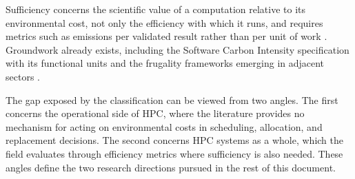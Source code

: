 Sufficiency concerns the scientific value of a computation relative to its environmental cost, not only the efficiency with which it runs, and requires metrics such as emissions per validated result rather than per unit of work \parencite{portegieszwart2020Ecological, lannelongue2021Green}. Groundwork already exists, including the Software Carbon Intensity specification with its functional units \parencite{greensoftwarefoundation2024Software} and the frugality frameworks emerging in adjacent sectors \parencite{associationfrancaisedenormalisation2024General}.

The gap exposed by the classification can be viewed from two angles. The first concerns the operational side of HPC, where the literature provides no mechanism for acting on environmental costs in scheduling, allocation, and replacement decisions. The second concerns HPC systems as a whole, which the field evaluates through efficiency metrics where sufficiency is also needed. These angles define the two research directions pursued in the rest of this document.
